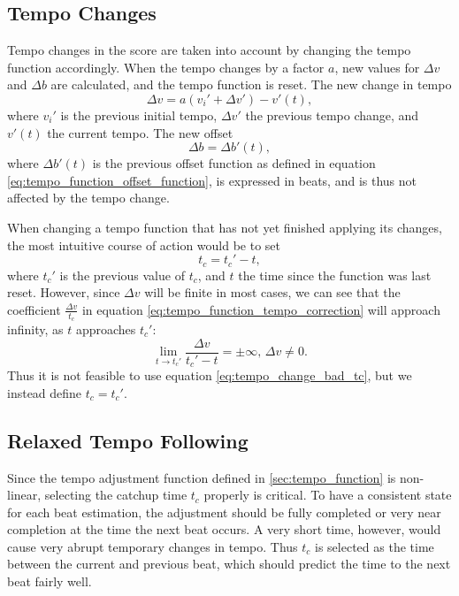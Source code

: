 \subsection{Tempo Changes}

Tempo changes in the score are taken into account
by changing the tempo function accordingly.
When the tempo changes by a factor $a$,
new values for $\Delta v$ and $\Delta b$ are calculated,
and the tempo function is reset.
The new change in tempo
\begin{equation}
\Delta v = a \left( v_i' + \Delta v' \right) - v'(t),
\end{equation}
where $v_i'$ is the previous initial tempo,
$\Delta v'$ the previous tempo change,
and $v'(t)$ the current tempo.
The new offset
\begin{equation}
\Delta b = \Delta b'(t),
\end{equation}
where $\Delta b'(t)$ is the previous offset function
as defined in equation \ref{eq:tempo_function_offset_function},
is expressed in beats,
and is thus not affected by the tempo change.

When changing a tempo function that has not yet
finished applying its changes,
the most intuitive course of action would be to set
\begin{equation}
\label{eq:tempo_change_bad_tc}
t_c = t_c' - t,
\end{equation}
where $t_c'$ is the previous value of $t_c$,
and $t$ the time since the function was last reset.
However, since $\Delta v$ will be finite in most cases,
we can see that the coefficient $\frac{\Delta v}{t_c}$
in equation \ref{eq:tempo_function_tempo_correction}
will approach infinity,
as $t$ approaches $t_c'$:
\begin{equation}
\lim_{t \to t_c'} \frac{\Delta v}{t_c' - t} = \pm \infty,
\, \Delta v \neq 0.
\end{equation}
Thus it is not feasible to use equation \ref{eq:tempo_change_bad_tc},
but we instead define $t_c = t_c'$.

\subsection{Relaxed Tempo Following}

Since the tempo adjustment function defined in
\ref{sec:tempo_function} is non-linear,
selecting the catchup time $t_c$ properly is critical.
To have a consistent state for each beat estimation,
the adjustment should be fully completed
or very near completion
at the time the next beat occurs.
A very short time, however,
would cause very abrupt temporary changes in tempo.
Thus $t_c$ is selected as the time between
the current and previous beat,
which should predict the time to the next
beat fairly well.

